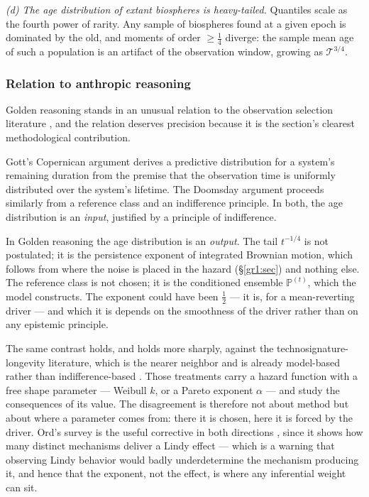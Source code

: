 \documentclass[11pt]{article}
\numberwithin{equation}{section}
\theoremstyle{plain}
\theoremstyle{definition}
\theoremstyle{remark}
\newcommand{\PP}{\mathbb{P}}
\begin{document}
\emph{(d) The age distribution of extant biospheres is heavy-tailed.}
Quantiles scale as the fourth power of rarity. Any sample of biospheres
found at a given epoch is dominated by the old, and moments of order
$\ge\tfrac14$ diverge: the sample mean age of such a population is an
artifact of the observation window, growing as $\mathcal T^{3/4}$.

\subsubsection{Relation to anthropic reasoning}\label{gr:subsub:anthropic}

Golden reasoning stands in an unusual relation to the observation
selection literature \cite{Car83,Got93,Bos02}, and the relation deserves precision because it is the section's clearest methodological
contribution.

Gott's Copernican argument \cite{Got93} derives a predictive
distribution for a system's remaining duration from the premise that the
observation time is uniformly distributed over the system's lifetime.
The Doomsday argument \cite{Car83,Bos02} proceeds similarly from a
reference class and an indifference principle. In both, the age
distribution is an \emph{input}, justified by a principle of
indifference.

In Golden reasoning the age distribution is an \emph{output}. The tail
$t^{-1/4}$ is not postulated; it is the persistence exponent of
integrated Brownian motion, which follows from where the noise is placed
in the hazard (\S\ref{gr1:sec}) and nothing else. The reference class is not
chosen; it is the conditioned ensemble $\PP^{(t)}$, which the model
constructs. The exponent could have been $\tfrac12$ --- it is, for a
mean-reverting driver --- and which it is depends on the smoothness of
the driver rather than on any epistemic principle.

The same contrast holds, and holds more sharply, against the
technosignature-longevity literature, which is the nearer neighbor and
is already model-based rather than indifference-based
\cite{BC21,BG24,Kip20}. Those treatments carry a hazard function with a
free shape parameter --- Weibull $k$, or a Pareto exponent $\alpha$ ---
and study the consequences of its value. The disagreement is therefore
not about method but about where a parameter comes from: there it is
chosen, here it is forced by the driver. Ord's survey is the useful
corrective in both directions \cite{Ord23}, since it shows how many
distinct mechanisms deliver a Lindy effect --- which is a warning that
observing Lindy behavior would badly underdetermine the mechanism
producing it, and hence that the exponent, not the effect, is where any
inferential weight can sit.
\end{document}
